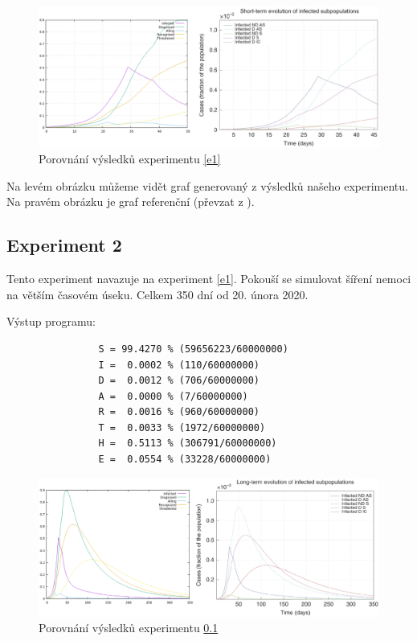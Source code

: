 \documentclass[a4paper,11pt]{article}
\begin{document}
			\begin{figure}[H]
				\caption{Porovnání výsledků experimentu \ref{e1}}
				\label{fig2}
				\centering
				\includegraphics[scale=0.6]{comparison.png}
			\end{figure}
			
			Na levém obrázku můžeme vidět graf generovaný z výsledků našeho experimentu. Na pravém obrázku je graf referenční (převzat z \cite{source}). 
			
		\subsection{Experiment 2}
		\label{e2}
			Tento experiment navazuje na experiment \ref{e1}. Pokouší se simulovat šíření nemoci na větším časovém úseku. Celkem 350 dní od 20. února 2020.
			
			Výstup programu:
			\begin{verbatim}
				S = 99.4270 % (59656223/60000000)
				I =  0.0002 % (110/60000000)
				D =  0.0012 % (706/60000000)
				A =  0.0000 % (7/60000000)
				R =  0.0016 % (960/60000000)
				T =  0.0033 % (1972/60000000)
				H =  0.5113 % (306791/60000000)
				E =  0.0554 % (33228/60000000)
			\end{verbatim}
		
			\begin{figure}[H]
				\caption{Porovnání výsledků experimentu \ref{e2}}
				\label{fig3}
				\centering
				\includegraphics[scale=0.6]{comparison2.png}
			\end{figure}
		
\end{document}
